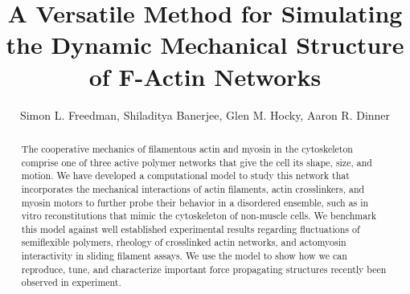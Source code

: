 \documentclass[12pt]{article}
\begin{document}
\title{A Versatile Method for Simulating the Dynamic Mechanical Structure of F-Actin Networks}
\author{Simon L. Freedman, Shiladitya Banerjee, Glen M. Hocky, Aaron R. Dinner}
\date{}
\maketitle
\begin{abstract}
  The cooperative mechanics of filamentous actin and myosin in the cytoskeleton comprise one of three active polymer
  networks that give the cell its shape, size, and motion. We have developed a computational model to study this network that incorporates 
  the mechanical interactions of actin filaments, actin crosslinkers, and myosin motors to further
  probe their behavior in a disordered ensemble, such as in vitro reconstitutions that mimic the cytoskeleton of non-muscle cells. 
  We benchmark this model against well established experimental results regarding fluctuations of
  semiflexible polymers, rheology of crosslinked actin networks, and actomyosin interactivity in sliding filament assays. 
  We use the model to show how we can reproduce, tune, and characterize important force propagating structures 
  recently been observed in experiment. 
\end{abstract}
\end{document}
